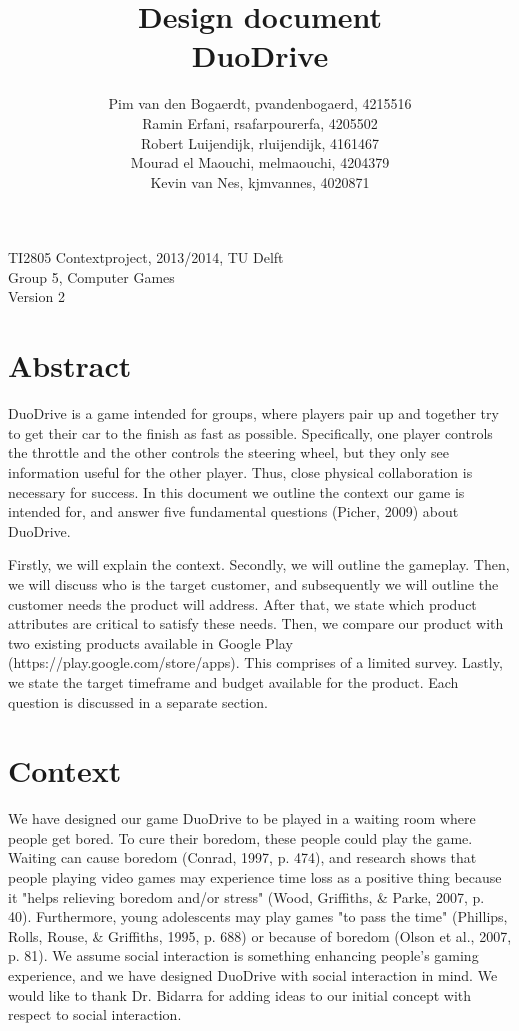 \documentclass[11pt,twoside,a4paper]{article}
\title{
  Design document\\
  DuoDrive
}
\author{
	Pim van den Bogaerdt, pvandenbogaerd, 4215516\\
	Ramin Erfani, rsafarpourerfa, 4205502\\
	Robert Luijendijk, rluijendijk, 4161467\\
	Mourad el Maouchi, melmaouchi, 4204379\\
	Kevin van Nes, kjmvannes, 4020871
}
\begin{document}
\maketitle
\begin{center}
TI2805 Contextproject, 2013/2014, TU Delft\\
Group 5, Computer Games\\
Version 2
\end{center}
\clearpage

\section*{Abstract}
DuoDrive is a game intended for groups, where players pair up and together try to get their car to the finish as fast as possible. Specifically, one player controls the throttle and the other controls the steering wheel, but they only see information useful for the other player. Thus, close physical collaboration is necessary for success. In this document we outline the context our game is intended for, and answer five fundamental questions (Picher, 2009) about DuoDrive.

Firstly, we will explain the context. Secondly, we will outline the gameplay. Then, we will discuss who is the target customer, and subsequently we will outline the customer needs the product will address. After that, we state which product attributes are critical to satisfy these needs. Then, we compare our product with two existing products available in Google Play (https://play.google.com/store/apps). This comprises of a limited survey. Lastly, we state the target timeframe and budget available for the product. Each question is discussed in a separate section.

\clearpage
\tableofcontents

\clearpage

\section{Context}
We have designed our game DuoDrive to be played in a waiting room where people get bored. To cure their boredom, these people could play the game. Waiting can cause boredom (Conrad, 1997, p. 474), and research shows that people playing video games may experience time loss as a positive thing because it "helps relieving boredom and/or stress" (Wood, Griffiths, \& Parke, 2007, p. 40). Furthermore, young adolescents may play games "to pass the time" (Phillips, Rolls, Rouse, \& Griffiths, 1995, p. 688) or because of boredom (Olson et al., 2007, p. 81). We assume social interaction is something enhancing people's gaming experience, and we have designed DuoDrive with social interaction in mind. We would like to thank Dr. Bidarra for adding ideas to our initial concept with respect to social interaction.
\end{document}

